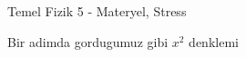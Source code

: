 \documentclass[12pt,fleqn]{article}\usepackage{../../common}
\begin{document}
Temel Fizik 5 - Materyel, Stress


Bir adimda gordugumuz gibi $x^2$ denklemi
\end{document}

